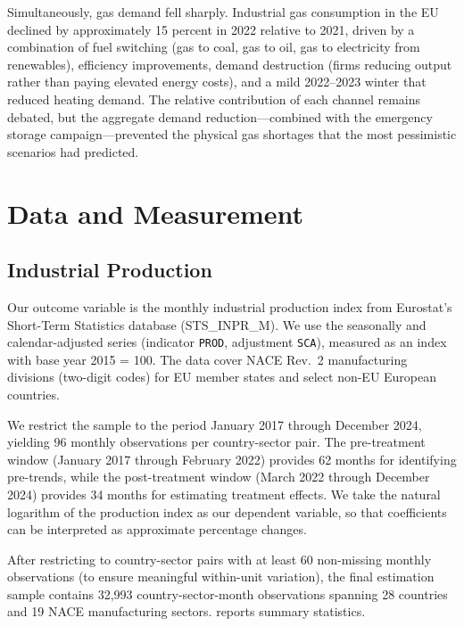 \documentclass[12pt]{article}
\begin{document}
Simultaneously, gas demand fell sharply. Industrial gas consumption in the EU declined by approximately 15 percent in 2022 relative to 2021, driven by a combination of fuel switching (gas to coal, gas to oil, gas to electricity from renewables), efficiency improvements, demand destruction (firms reducing output rather than paying elevated energy costs), and a mild 2022--2023 winter that reduced heating demand. The relative contribution of each channel remains debated, but the aggregate demand reduction---combined with the emergency storage campaign---prevented the physical gas shortages that the most pessimistic scenarios had predicted.


\section{Data and Measurement}
\label{sec:data}

\subsection{Industrial Production}

Our outcome variable is the monthly industrial production index from Eurostat's Short-Term Statistics database (STS\_INPR\_M). We use the seasonally and calendar-adjusted series (indicator \texttt{PROD}, adjustment \texttt{SCA}), measured as an index with base year 2015 = 100. The data cover NACE Rev.~2 manufacturing divisions (two-digit codes) for EU member states and select non-EU European countries.

We restrict the sample to the period January 2017 through December 2024, yielding 96 monthly observations per country-sector pair. The pre-treatment window (January 2017 through February 2022) provides 62 months for identifying pre-trends, while the post-treatment window (March 2022 through December 2024) provides 34 months for estimating treatment effects. We take the natural logarithm of the production index as our dependent variable, so that coefficients can be interpreted as approximate percentage changes.

After restricting to country-sector pairs with at least 60 non-missing monthly observations (to ensure meaningful within-unit variation), the final estimation sample contains 32,993 country-sector-month observations spanning 28 countries and 19 NACE manufacturing sectors.  reports summary statistics.
\end{document}
